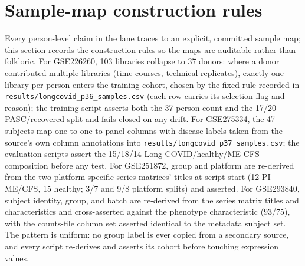 \documentclass[11pt,a4paper]{article}
\begin{document}
\section{Sample-map construction rules}
Every person-level claim in the lane traces to an explicit, committed sample
map; this section records the construction rules so the maps are auditable
rather than folkloric. For GSE226260, 103 libraries collapse to 37 donors:
where a donor contributed multiple libraries (time courses, technical
replicates), exactly one library per person enters the training cohort, chosen
by the fixed rule recorded in \texttt{results/longcovid\_p36\_samples.csv}
(each row carries its selection flag and reason); the training script asserts
both the 37-person count and the 17/20 PASC/recovered split and fails closed
on any drift. For GSE275334, the 47 subjects map one-to-one to panel columns
with disease labels taken from the source's own column annotations into
\texttt{results/longcovid\_p37\_samples.csv}; the evaluation scripts assert
the 15/18/14 Long COVID/healthy/ME-CFS composition before any test. For
GSE251872, group and platform are re-derived from the two platform-specific
series matrices' titles at script start (12 PI-ME/CFS, 15 healthy; 3/7 and
9/8 platform splits) and asserted. For GSE293840, subject identity, group,
and batch are re-derived from the series matrix titles and characteristics
and cross-asserted against the phenotype characteristic (93/75), with the
counts-file column set asserted identical to the metadata subject set. The
pattern is uniform: no group label is ever copied from a secondary source,
and every script re-derives and asserts its cohort before touching
expression values.
\end{document}
